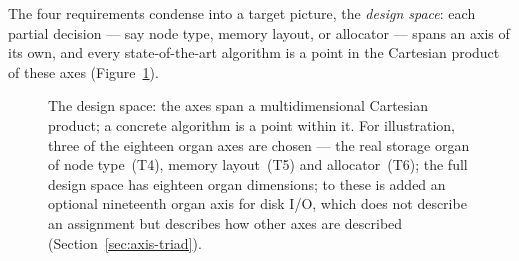 The four requirements condense into a target picture, the \emph{design space}: each partial decision ---
say node type, memory layout, or allocator --- spans an axis of its own, and every state-of-the-art
algorithm is a point in the Cartesian product of these axes (Figure~\ref{fig:design-space}).
\begin{figure}[htbp]\centering
{}
\caption{The design space: the axes span a multidimensional Cartesian product; a concrete algorithm is a point within it. For illustration, three of the eighteen organ axes are chosen --- the real storage organ of node type~(T4), memory layout~(T5) and allocator~(T6); the full design space has eighteen organ dimensions; to these is added an optional nineteenth organ axis for disk I/O, which does not describe an assignment but describes how other axes are described (Section~\ref{sec:axis-triad}).}\label{fig:design-space}
\end{figure}

